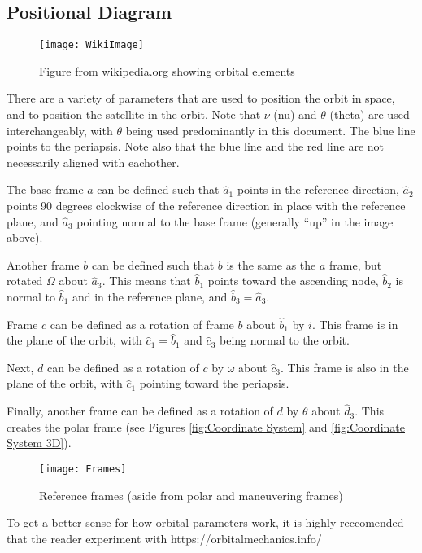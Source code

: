\documentclass[../basicOrbitalDynamics.tex]{subfiles}
\begin{document}
\bigskip\bigskip
\subsection{Positional Diagram}
\begin{figure}[H]
    \centering
    \texttt{[image: WikiImage]}
    \caption{Figure from wikipedia.org showing orbital elements}\label{fig:Wiki Image}
\end{figure}
There are a variety of parameters that are used to position the orbit in space, and to position the satellite in the orbit. Note that $\nu$ (nu) and $\theta$ (theta) are used interchangeably, with $\theta$ being used predominantly in this document. The blue line points to the periapsis. Note also that the blue line and the red line are not necessarily aligned with eachother.

The base frame $a$ can be defined such that $\hat{a}_1$ points in the reference direction, $\hat{a}_2$ points 90 degrees clockwise of the reference direction in place with the reference plane, and $\hat{a}_3$ pointing normal to the base frame (generally ``up'' in the image above).

Another frame $b$ can be defined such that $b$ is the same as the $a$ frame, but rotated $\Omega$ about $\hat{a}_3$. This means that $\hat{b}_1$ points toward the ascending node, $\hat{b}_2$ is normal to $\hat{b}_1$ and in the reference plane, and $\hat{b}_3=\hat{a}_3$.

Frame $c$ can be defined as a rotation of frame $b$ about $\hat{b}_1$ by $i$. This frame is in the plane of the orbit, with $\hat{c}_1=\hat{b}_1$ and $\hat{c}_3$ being normal to the orbit.

Next, $d$ can be defined as a rotation of $c$ by $\omega$ about $\hat{c}_3$. This frame is also in the plane of the orbit, with $\hat{c}_1$ pointing toward the periapsis.

Finally, another frame can be defined as a rotation of $d$ by $\theta$ about $\hat{d}_3$. This creates the polar frame (see Figures \ref{fig:Coordinate System} and \ref{fig:Coordinate System 3D}).

\begin{figure}[H]
    \centering
    \texttt{[image: Frames]}
    \caption{Reference frames (aside from polar and maneuvering frames)}\label{fig:Frames}
\end{figure}

To get a better sense for how orbital parameters work, it is highly reccomended that the reader experiment with https://orbitalmechanics.info/
\end{document}
